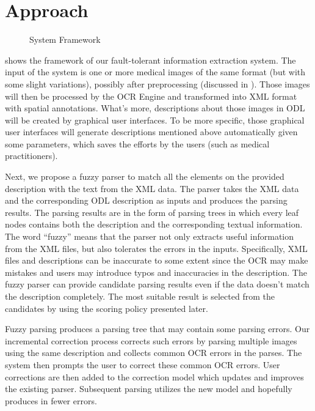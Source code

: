 \section{Approach}
\label{sec:appro}
%

\begin{figure}[ht]
\centering
{}
\caption{System Framework}
\label{fig:frame}
\end{figure}

 shows the framework of our fault-tolerant
information extraction system. The input of the system is
one or more medical images of the same format (but 
with some slight variations), possibly after preprocessing (discussed in
). Those images will then be processed by the OCR Engine 
and transformed into XML format with spatial annotations. 
What's more, descriptions about those images in ODL will be created 
by graphical user interfaces. To be more specific, those 
graphical user interfaces will  generate descriptions mentioned above 
automatically given some parameters, which saves the efforts by the users 
(such as medical practitioners).

 
Next, we propose a fuzzy parser to match all the elements on 
the provided description with the text from the XML data. The 
parser takes the XML data and the corresponding ODL description as inputs 
and produces the parsing results. The parsing results are in the form of 
parsing trees in which every leaf nodes contains both the description and 
the corresponding textual information.
The word ``fuzzy'' means that the parser not only 
extracts useful information from the XML files, but also tolerates the 
errors in the inputs. Specifically, XML files 
and descriptions can be inaccurate to some extent since the OCR may make
mistakes and users may introduce typos and inaccuracies in the description. 
The fuzzy parser can provide candidate parsing results even if the data doesn't
match the description completely. The most suitable result is selected 
from the candidates by using the scoring policy presented later.    

Fuzzy parsing produces a parsing tree 
that may contain some parsing errors. 
Our incremental correction process corrects such errors by
parsing multiple images using the same description and collects
common OCR errors in the parses.  
The system then prompts the user to correct these common OCR errors. 
User corrections are then added to the correction model 
which updates and improves the existing parser.
Subsequent parsing utilizes the new model 
and hopefully produces in fewer errors.

